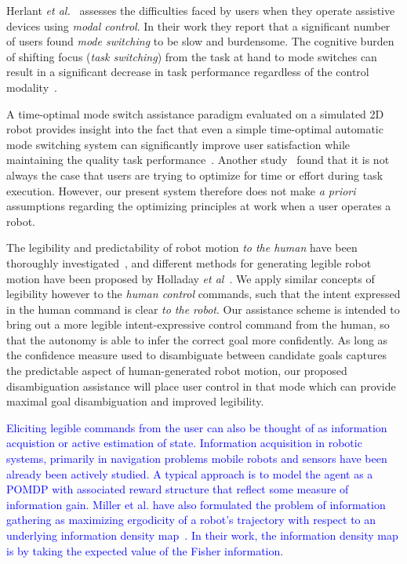 \documentclass[conference]{IEEEtran}
\begin{document}
Herlant \textit{et al.}~\cite{herlant2016assistive} assesses the difficulties faced by users when they operate assistive devices using \textit{modal control}. In their work they report that a significant number of users found \textit{mode switching} to be slow and burdensome. The cognitive burden of shifting focus (\textit{task switching})  from the task at hand to mode switches can result in a significant decrease in task performance regardless of the control modality~\cite{monsell2003task}. 

 A time-optimal mode switch assistance paradigm evaluated on a simulated 2D robot provides insight into the fact that even a simple time-optimal automatic mode switching system can significantly improve user satisfaction while maintaining the quality task performance~\cite{herlant2016assistive}.  Another study~\cite{gopinath2017human} found that it is not always the case that users are trying to optimize for time or effort during task execution. However, our present system therefore does not make \textit{a priori} assumptions regarding the optimizing principles at work when a user operates a robot.

The legibility and predictability of robot motion \textit{to the human} have been thoroughly investigated~\cite{dragan2013legibility}, and different methods for generating legible robot motion have been proposed by Holladay \textit{et al}~\cite{holladay2014legible}. We apply similar concepts of legibility however to the \textit{human control} commands, such that the intent expressed in the human command is clear \textit{to the robot}. Our assistance scheme is intended to bring out a more legible intent-expressive control command from the human, so that the autonomy is able to infer the correct goal more confidently. As long as the confidence measure used to disambiguate between candidate goals captures the predictable aspect of human-generated robot motion, our proposed disambiguation assistance will place user control in that mode which can provide maximal goal disambiguation and improved legibility.

\textcolor{blue}{Eliciting legible commands from the user can also be thought of as information acquistion or active estimation of state. Information acquisition in robotic systems, primarily in navigation problems mobile robots and sensors have been already been actively studied. A typical approach is to model the agent as a POMDP with associated reward structure that reflect some measure of information gain. Miller et al. have also formulated the problem of information gathering as maximizing ergodicity of a robot's trajectory with respect to an underlying  information density map~\cite{miller2013trajectory,miller2016ergodic}. In their work, the information density map is by taking the expected value of the Fisher information}.
\end{document}
